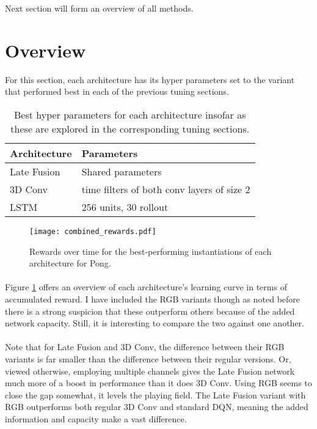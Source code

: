 Next section will form an overview of all methods.

\section{Overview}
\label{sec:overview}
For this section,
each architecture has its hyper parameters set
to the variant that performed best
in each of the previous tuning sections.

\begin{table}[htpb]
  \center
  \begin{tabular}{ll}
    Architecture & Parameters \\
    \hline
    Late Fusion & Shared parameters \\
    3D Conv & time filters of both conv layers of size 2 \\
    LSTM & 256 units, 30 rollout \\
  \end{tabular}
  \caption[Best architecture hyper parameters]{
    Best hyper parameters for each architecture insofar as these are explored
    in the corresponding tuning sections.
  }
\end{table}

\begin{figure}[htpb]
  \centering
  \texttt{[image: combined\_rewards.pdf]}
  \caption[Architecture performance comparison]{
    Rewards over time
    for the best-performing instantiations
    of each architecture
    for Pong.
  }
  \label{fig:combined_rewards}
\end{figure}

\paragraph{}
Figure \ref{fig:combined_rewards}
offers an overview of each architecture's
learning curve in terms of accumulated reward.
I have included the RGB variants
though as noted before there is a strong suspicion
that these outperform others because of the added network capacity.
Still, it is interesting to compare the two against one another.

\paragraph{}
Note that for Late Fusion and 3D Conv,
the difference between their RGB variants
is far smaller than the difference
between their regular versions.
Or, viewed otherwise,
employing multiple channels
gives the Late Fusion network
much more of a boost in performance than it does 3D Conv.
Using RGB seems to close the gap somewhat,
it levels the playing field.
The Late Fusion variant with RGB
outperforms both regular 3D Conv and standard DQN,
meaning the added information and capacity
make a vast difference.

